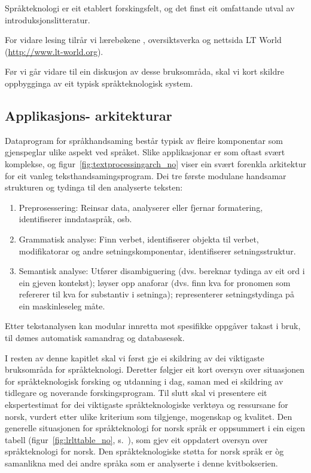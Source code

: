 \begin{multicols}{2}
Språkteknologi er eit etablert forskingsfelt, og det finst eit omfattande utval av introduksjonslitteratur.

For vidare lesing tilrår vi lærebøkene \cite{jurafsky-martin01, manning-schuetze1}, oversiktsverka \cite{lt-survey1} og nettsida LT World (\url{http://www.lt-world.org}).

Før vi går vidare til ein diskusjon av desse bruksområda, skal vi kort skildre oppbygginga av eit typisk språkteknologisk system. 

\subsection[Applikasjonsarkitekturar]{Applikasjons- arkitekturar}

Dataprogram for språkhandsaming består typisk av fleire komponentar som gjenspeglar ulike aspekt ved språket. Slike applikasjonar er som oftast svært komplekse, og figur~\ref{fig:textprocessingarch_no} viser ein svært forenkla arkitektur for eit vanleg teksthandsamingsprogram. Dei tre første modulane handsamar strukturen og tydinga til den analyserte teksten:

\begin{enumerate}
\item Preprosessering: Reinsar data, analyserer eller fjernar formatering, identifiserer inndataspråk, osb. 
\item Grammatisk analyse: Finn verbet, identifiserer objekta til verbet, modifikatorar og andre setningskomponentar, identifiserer setningsstruktur. 
\item Semantisk analyse: Utfører disambiguering (dvs. bereknar tydinga av eit ord i ein gjeven kontekst); løyser opp anaforar (dvs. finn kva for pronomen som refererer til kva for substantiv i setninga); representerer setningstydinga på ein maskinleseleg måte.
\end{enumerate}

Etter tekstanalysen kan modular innretta mot spesifikke oppgåver takast i bruk, til dømes automatisk samandrag og databasesøk. 

I resten av denne kapitlet skal vi først gje ei skildring av dei viktigaste bruksområda for språkteknologi. Deretter følgjer eit kort oversyn over situasjonen for språkteknologisk forsking og utdanning i dag, saman med ei skildring av tidlegare og noverande forskingsprogram. Til slutt skal vi presentere eit ekspertestimat for dei viktigaste språkteknologiske verktøya og ressursane for norsk, vurdert etter ulike kriterium som tilgjenge, mogenskap og kvalitet. Den generelle situasjonen for språkteknologi for norsk språk er oppsummert i ein eigen tabell (figur~\ref{fig:lrlttable_no}, s.~\pageref{fig:lrlttable_no}), som gjev eit oppdatert oversyn over språkteknologi for norsk. Den språkteknologiske støtta for norsk språk er òg samanlikna med dei andre språka som er analyserte i denne kvitbokserien. 


\end{multicols}

